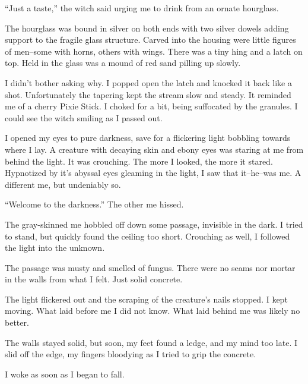 ``Just a taste,'' the witch said urging me to drink from an ornate hourglass.
\VV


\noindent
The hourglass was bound in silver on both ends with two silver dowels adding support to
the fragile glass structure.  Carved into the housing were little figures of
men--some with horns, others with wings.  There was a tiny hing and a latch on top.
Held in the glass was a mound of red sand pilling up slowly.


I didn't bother asking why.  I popped open the latch and knocked it back like a shot.
Unfortunately the tapering kept the stream slow and steady.
It reminded me of a cherry Pixie Stick.
I choked for a bit, being suffocated by the granules.
I could see the witch smiling as I passed out.


I opened my eyes to pure darkness, save for a flickering light bobbling
towards where I lay.
A creature with decaying skin and ebony eyes was staring at me from behind the light.
It was crouching.  The more I looked, the more it stared.  Hypnotized by it's abyssal
eyes gleaming in the light, I saw that it--he--was me.
A different me, but undeniably so.
\VV


``Welcome to the darkness.''  The other me hissed.
\VV


\noindent
The gray-skinned me hobbled off down some passage, invisible in the dark.
I tried to stand, but quickly found the ceiling too short.  Crouching as well,
I followed the light into the unknown.


The passage was musty and smelled of fungus.  There were no seams nor mortar in
the walls from what I felt.  Just solid concrete.


The light flickered out and the scraping of the creature's nails stopped.
I kept moving.  What laid before me I did not know.
What laid behind me was likely no better.


The walls stayed solid, but soon, my feet found a ledge, and my mind too late.
I slid off the edge, my fingers bloodying as I tried to grip the concrete.

I woke as soon as I began to fall.
%
%
